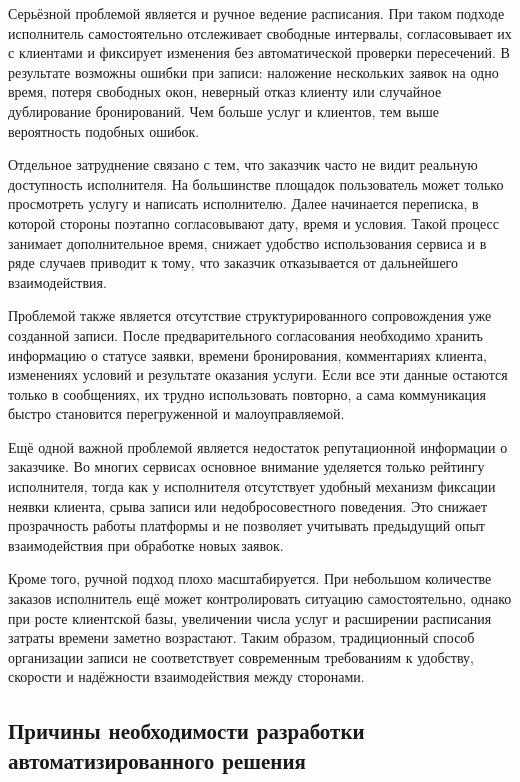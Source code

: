 Серьёзной проблемой является и ручное ведение расписания. При таком подходе исполнитель самостоятельно отслеживает свободные интервалы, согласовывает их с клиентами и фиксирует изменения без автоматической проверки пересечений. В результате возможны ошибки при записи: наложение нескольких заявок на одно время, потеря свободных окон, неверный отказ клиенту или случайное дублирование бронирований. Чем больше услуг и клиентов, тем выше вероятность подобных ошибок.

Отдельное затруднение связано с тем, что заказчик часто не видит реальную доступность исполнителя. На большинстве площадок пользователь может только просмотреть услугу и написать исполнителю. Далее начинается переписка, в которой стороны поэтапно согласовывают дату, время и условия. Такой процесс занимает дополнительное время, снижает удобство использования сервиса и в ряде случаев приводит к тому, что заказчик отказывается от дальнейшего взаимодействия.

Проблемой также является отсутствие структурированного сопровождения уже созданной записи. После предварительного согласования необходимо хранить информацию о статусе заявки, времени бронирования, комментариях клиента, изменениях условий и результате оказания услуги. Если все эти данные остаются только в сообщениях, их трудно использовать повторно, а сама коммуникация быстро становится перегруженной и малоуправляемой.

Ещё одной важной проблемой является недостаток репутационной информации о заказчике. Во многих сервисах основное внимание уделяется только рейтингу исполнителя, тогда как у исполнителя отсутствует удобный механизм фиксации неявки клиента, срыва записи или недобросовестного поведения. Это снижает прозрачность работы платформы и не позволяет учитывать предыдущий опыт взаимодействия при обработке новых заявок.

Кроме того, ручной подход плохо масштабируется. При небольшом количестве заказов исполнитель ещё может контролировать ситуацию самостоятельно, однако при росте клиентской базы, увеличении числа услуг и расширении расписания затраты времени заметно возрастают. Таким образом, традиционный способ организации записи не соответствует современным требованиям к удобству, скорости и надёжности взаимодействия между сторонами.

\subsection{Причины необходимости разработки автоматизированного решения}

